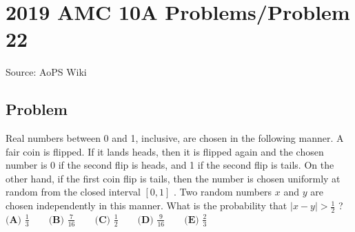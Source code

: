 \documentclass[12pt]{article}
\begin{document}
\section*{{2019 AMC 10A Problems/Problem 22}}
Source: AoPS Wiki

\subsection*{Problem}
Real numbers between 0 and 1, inclusive, are chosen in the following manner. A fair coin is flipped. If it lands heads, then it is flipped again and the chosen number is 0 if the second flip is heads, and 1 if the second flip is tails. On the other hand, if the first coin flip is tails, then the number is chosen uniformly at random from the closed interval $[0,1]$ . Two random numbers $x$ and $y$ are chosen independently in this manner. What is the probability that $|x-y| > \tfrac{1}{2}$ ? $\textbf{(A) } \frac{1}{3} \qquad \textbf{(B) } \frac{7}{16} \qquad \textbf{(C) } \frac{1}{2} \qquad \textbf{(D) } \frac{9}{16} \qquad \textbf{(E) } \frac{2}{3}$
\end{document}
